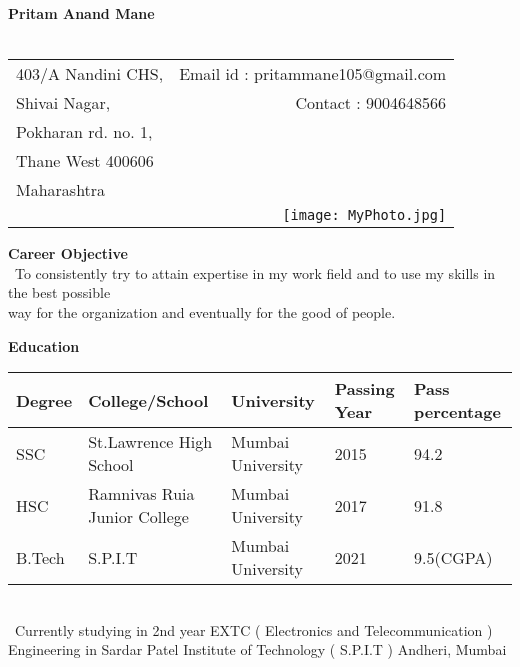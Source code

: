 \documentclass[12pt]{article}
\begin{document}
\begin{flushleft}
	
\hspace{65mm}
\textbf{Pritam Anand Mane}\\

\hrulefill
\vspace{3mm} \\

\begin{tabular}{l r}
  	403/A Nandini CHS, & \hspace{40mm} Email id : pritammane105@gmail.com \\
  	Shivai Nagar, & Contact : 9004648566\\ 
  	Pokharan rd. no. 1,\\ 
  	Thane West  400606 \\
  	Maharashtra  \\
  	 & \texttt{[image: MyPhoto.jpg]}
\end{tabular}
\end{flushleft}
\vspace{3mm} 
\begin{flushleft}
	\textbf{Career Objective}\\
	\vspace{5mm}
	\  To consistently try to attain expertise in my work field and to use my skills in the best possible \\way for the organization and eventually for the good of people.\\
\end{flushleft}

\vspace{5mm}
\textbf{Education}\\

\begin{flushleft}

\begin{tabular}{|l|l|l|l|l|}
	\hline
	Degree & College/School & University & Passing Year & Pass percentage \\
	\hline
	SSC & St.Lawrence High School & Mumbai University & 2015 & 94.2\\
	HSC & Ramnivas Ruia Junior College & Mumbai University & 2017 & 91.8\\
	B.Tech & S.P.I.T  & Mumbai University & 2021 & 9.5(CGPA)\\
	\hline 
	
\end{tabular} \\
\vspace{8mm}
\ Currently studying in 2nd year EXTC ( Electronics and Telecommunication ) Engineering in Sardar Patel Institute of Technology ( S.P.I.T ) Andheri, Mumbai\\
\end{flushleft}
\end{document}
